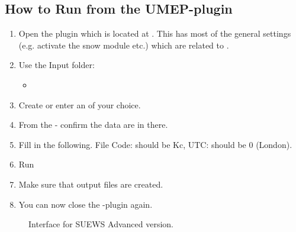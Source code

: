\documentclass[letterpaper,10pt,english]{sphinxmanual}
\begin{document}
\subsection{How to Run from the UMEP-plugin}
\label{\detokenize{Tutorials/SuewsAdvanced:how-to-run-from-the-umep-plugin}}
\begin{enumerate}
\item {} 
Open the plugin which is located at . This has
most of the general settings (e.g. activate the snow module etc.)
which are related to
.

\item {} 
Use the Input folder:
\begin{itemize}
\item {} 

\end{itemize}

\item {} 
Create or enter an  of your choice.

\item {} 
From the  - confirm the data are in there.

\item {} 
Fill in the following. File Code: should be Kc, UTC: should be 0
(London).

\item {} 
Run

\item {} 
Make sure that output files are created.

\item {} 
You can now close the -plugin again.

\end{enumerate}

\begin{figure}[htbp]
\centering
\capstart

\noindent{}
\caption{Interface for SUEWS Advanced version.}\label{\detokenize{Tutorials/SuewsAdvanced:id1}}\end{figure}
\end{document}

